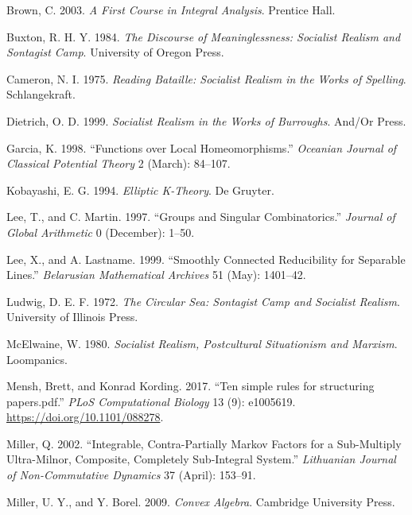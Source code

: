 \documentclass[10pt,english,]{book} %
\theoremstyle{definition}
\theoremstyle{definition}
\theoremstyle{definition}
\theoremstyle{remark}
\begin{document}
\leavevmode\hypertarget{ref-cite:2}{}%
Brown, C. 2003. \emph{A First Course in Integral Analysis}. Prentice Hall.

\leavevmode\hypertarget{ref-Buxton1984}{}%
Buxton, R. H. Y. 1984. \emph{The Discourse of Meaninglessness: Socialist Realism and Sontagist Camp}. University of Oregon Press.

\leavevmode\hypertarget{ref-Cameron1975}{}%
Cameron, N. I. 1975. \emph{Reading Bataille: Socialist Realism in the Works of Spelling}. Schlangekraft.

\leavevmode\hypertarget{ref-Dietrich1999}{}%
Dietrich, O. D. 1999. \emph{Socialist Realism in the Works of Burroughs}. And/Or Press.

\leavevmode\hypertarget{ref-cite:17}{}%
Garcia, K. 1998. ``Functions over Local Homeomorphisms.'' \emph{Oceanian Journal of Classical Potential Theory} 2 (March): 84--107.

\leavevmode\hypertarget{ref-cite:10}{}%
Kobayashi, E. G. 1994. \emph{Elliptic K-Theory}. De Gruyter.

\leavevmode\hypertarget{ref-cite:30}{}%
Lee, T., and C. Martin. 1997. ``Groups and Singular Combinatorics.'' \emph{Journal of Global Arithmetic} 0 (December): 1--50.

\leavevmode\hypertarget{ref-cite:29}{}%
Lee, X., and A. Lastname. 1999. ``Smoothly Connected Reducibility for Separable Lines.'' \emph{Belarusian Mathematical Archives} 51 (May): 1401--42.

\leavevmode\hypertarget{ref-Ludwig1972}{}%
Ludwig, D. E. F. 1972. \emph{The Circular Sea: Sontagist Camp and Socialist Realism}. University of Illinois Press.

\leavevmode\hypertarget{ref-McElwaine1980}{}%
McElwaine, W. 1980. \emph{Socialist Realism, Postcultural Situationism and Marxism}. Loompanics.

\leavevmode\hypertarget{ref-Mensh2017}{}%
Mensh, Brett, and Konrad Kording. 2017. ``Ten simple rules for structuring papers.pdf.'' \emph{PLoS Computational Biology} 13 (9): e1005619. \url{https://doi.org/10.1101/088278}.

\leavevmode\hypertarget{ref-cite:14}{}%
Miller, Q. 2002. ``Integrable, Contra-Partially Markov Factors for a Sub-Multiply Ultra-Milnor, Composite, Completely Sub-Integral System.'' \emph{Lithuanian Journal of Non-Commutative Dynamics} 37 (April): 153--91.

\leavevmode\hypertarget{ref-cite:3}{}%
Miller, U. Y., and Y. Borel. 2009. \emph{Convex Algebra}. Cambridge University Press.
\end{document}
